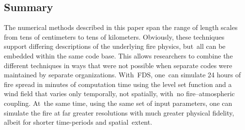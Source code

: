 \documentclass[atmosphere,article,accept,moreauthors,pdftex]{Definitions/mdpi}
\begin{document}
\begin{paracol}{2}
\section{Summary} \label{sec:summary}

The numerical methods described in this paper span the range of length scales from tens of centimeters to tens of kilometers. Obviously, these techniques support differing descriptions of the underlying fire physics, but~all can be embedded within the same code base. This allows researchers to combine the different techniques in ways that were not possible when separate codes were maintained by separate organizations. With~FDS, \mbox{one can} simulate 24 hours of fire spread in minutes of computation time using the level set function and a wind field that varies only temporally, not spatially, with~no fire–atmospheric coupling. At~the same time, using the same set of input parameters, one can simulate the fire at far greater resolutions with much greater physical fidelity, albeit for shorter time-periods and spatial~extent.

\vspace{6pt}




 


\end{paracol}


%
\end{document}
